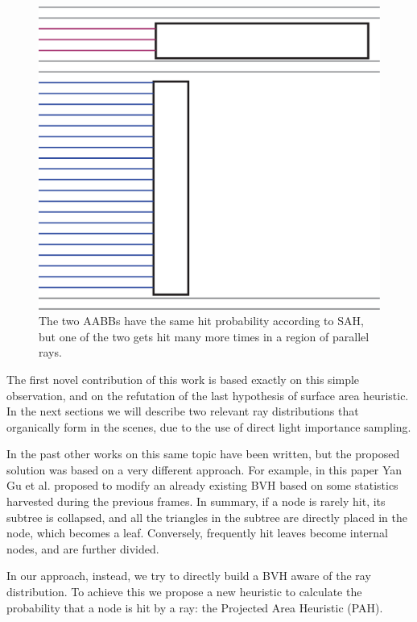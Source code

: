 \documentclass{PoliMi_MasterThesis}
\begin{document}
\begin{figure}[H]
    \centering
    \includegraphics[width=\textwidth*\real{0.5}]{Images/rays_parallel_hit_prob.png}
    \caption{The two AABBs have the same hit probability according to SAH, but one of the two gets hit many more times in a region of parallel rays.}
    \label{fig:flat_long_aabb}
\end{figure}

The first novel contribution of this work is based exactly on this simple observation, and on the refutation of the last hypothesis of surface area heuristic. In the next sections we will describe two relevant ray distributions that organically form in the scenes, due to the use of direct light importance sampling.

In the past other works on this same topic have been written, but the proposed solution was based on a very different approach. For example, in this paper \cite{distribution_aware_bvhs} Yan Gu et al. proposed to modify an already existing BVH based on some statistics harvested during the previous frames. In summary, if a node is rarely hit, its subtree is collapsed, and all the triangles in the subtree are directly placed in the node, which becomes a leaf. Conversely, frequently hit leaves become internal nodes, and are further divided.

In our approach, instead, we try to directly build a BVH aware of the ray distribution. To achieve this we propose a new heuristic to calculate the probability that a node is hit by a ray: the Projected Area Heuristic (PAH).
\end{document}
